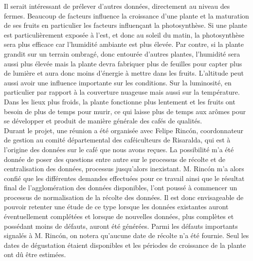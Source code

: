 



\noindent Il serait intéressant de prélever d'autres données, directement au niveau des fermes. Beaucoup de facteurs influence la croissance d'une plante et la maturation de ses fruits en particulier les facteurs influençant la photosynthèse. Si une plante est particulièrement exposée à l'est, et donc au soleil du matin, la photosynthèse sera plus efficace car l'humidité ambiante est plus élevée. Par contre, si la plante grandit sur un terrain ombragé, donc entourée d'autres plantes, l'humidité sera aussi plus élevée mais la plante devra fabriquer plus de feuilles pour capter plus de lumière et aura donc moins d'énergie à mettre dans les fruits. L'altitude peut aussi avoir une influence importante sur les conditions. Sur la luminosité, en particulier par rapport à la couverture nuageuse mais aussi sur la température. Dans les lieux plus froids, la plante fonctionne plus lentement et les fruits ont besoin de plus de temps pour murir, ce qui laisse plus de temps aux arômes pour se développer et produit de manière générale des cafés de qualités.  \\






\noindent Durant le projet, une réunion a été organisée avec Felipe Rincón, coordonnateur de gestion au comité départemental des caféiculteurs de Risaralda, qui est à l'origine des données sur le café que nous avons reçues. La possibilité m'a été donnée de poser des questions entre autre sur le processus de récolte et de centralisation des données, processus jusqu'alors inexistant. M. Rincón m'a alors confié que les différentes demandes effectuées pour ce travail ainsi que le résultat final de l'agglomération des données disponibles, l'ont poussé à commencer un processus de normalisation de la récolte des données. Il est donc envisageable de pouvoir retenter une étude de ce type lorsque les données existantes auront éventuellement complétées et lorsque de nouvelles données, plus complètes et possédant moins de défauts, auront été générées. Parmi les défauts importants signalés à M. Rincón, on notera qu'aucune date de récolte n'a été fournie. Seul les dates de dégustation étaient disponibles et les périodes de croissance de la plante ont dû être estimées. \\


